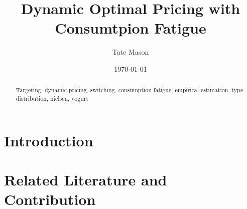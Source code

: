 \documentclass[12pt]{article}
\title{Dynamic Optimal Pricing with Consumtpion Fatigue}
\author{Tate Mason}
\date{\today}
\theoremstyle{definition}
\theoremstyle{remark}
\begin{document}
\maketitle

\begin{abstract}

Targeting, dynamic pricing, switching, consumption fatigue, empirical estimation, type distribution, nielsen, yogurt

\end{abstract}

\newpage


\section{Introduction}
\label{sec:introduction}



\section{Related Literature and Contribution}
\label{sec:literature}
\end{document}
